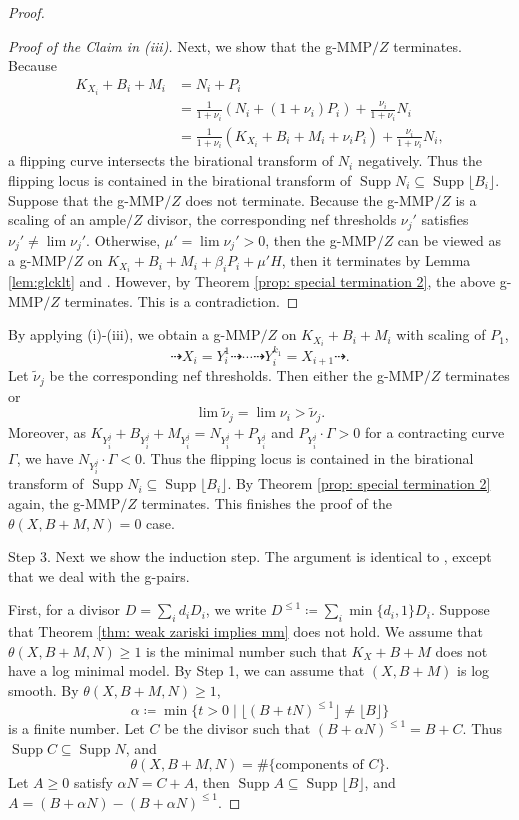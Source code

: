 \documentclass[11pt]{amsart}
\newcommand{\Supp}{\operatorname{Supp}}
\newcommand{\lf}{\lfloor}
\newcommand{\rf}{\rfloor}
\begin{document}
\begin{proof}
\begin{proof}[Proof of the Claim in (iii)]
	Next, we show that the g-MMP$/Z$ terminates. Because
	\begin{align*}
	K_{X_i}+B_i+M_i&=N_i+P_i\\
	&=\frac{1}{1+\nu_i}(N_i+(1+\nu_i)P_i)+\frac{\nu_i}{1+\nu_i}N_i\\
	&=\frac{1}{1+\nu_i}(K_{X_i}+B_i+M_i+\nu_i P_i)+\frac{\nu_i}{1+\nu_i}N_i,
	\end{align*}
	a flipping curve intersects the birational transform of $N_i$ negatively. Thus the flipping locus is contained in the birational transform of $\Supp N_i \subseteq \Supp \lfloor B_i\rfloor$. Suppose that the g-MMP$/Z$ does not terminate. Because the g-MMP$/Z$ is a scaling of an ample$/Z$ divisor, the corresponding nef thresholds $\nu_j'$ satisfies $\nu_j' \neq \lim \nu_j'$. Otherwise, $\mu'= \lim \nu_j'>0$, then the g-MMP$/Z$ can be viewed as a g-MMP$/Z$ on $K_{X_i}+B_i+M_i+\beta_iP_i+\mu' H$, then it terminates by Lemma \ref{lem:glcklt} and \cite[Corollary 1.4.2]{BCHM10}. However, by Theorem \ref{prop: special termination 2}, the above g-MMP$/Z$ terminates. This is a contradiction.	
\end{proof}
	
By applying (i)-(iii), we obtain a g-MMP$/Z$ on $K_{X_i}+B_i+M_i$ with scaling of $P_1$, 
\[
\dashrightarrow X_i = Y_i^{1} \dashrightarrow \cdots \dashrightarrow Y_i^{k_1} = X_{i+1} \dashrightarrow.
\] Let $\tilde\nu_j$ be the corresponding nef thresholds. Then either the g-MMP$/Z$ terminates or 
\[
\lim\tilde \nu_j = \lim\nu_i>\tilde \nu_j.
\] Moreover, as $K_{Y^j_i}+B_{Y^j_i}+M_{Y^j_i}=N_{Y^j_i}+P_{Y^j_i}$ and $P_{Y^j_i} \cdot \Gamma>0$ for a contracting curve $\Gamma$, we have $N_{Y^j_i} \cdot \Gamma<0$. Thus the flipping locus is contained in the birational transform of $\Supp N_i \subseteq \Supp \lfloor B_i\rfloor$. By Theorem \ref{prop: special termination 2} again, the g-MMP$/Z$ terminates. This finishes the proof of the $\theta(X,B+M,N)=0$ case.

Step 3. Next we show the induction step. The argument is identical to \cite[Proof of Theorem 1.5]{Birkarweak12}, except that we deal with the g-pairs. 

First, for a divisor $D=\sum_i d_i D_i$, we write $D^{\leq 1} \coloneqq \sum_i \min\{d_i, 1\}D_i$. Suppose that Theorem \ref{thm: weak zariski implies mm} does not hold. We assume that $\theta(X,B+M,N) \geq 1$ is the minimal number such that $K_X+B+M$ does not have a log minimal model. By Step 1, we can assume that $(X,B+M)$ is log smooth. By $\theta(X,B+M,N) \geq 1$,
	\[
	\alpha \coloneqq \min\{t>0 \mid \lf (B+tN)^{\leq 1} \rf \neq \lf B \rf\} 
	\] is a finite number. Let $C$ be the divisor such that $(B+\alpha N)^{\leq 1} = B+C$. Thus $\Supp C \subseteq \Supp N$, and 
	\begin{equation}\label{eq: components of C}
	\theta(X,B+M,N) = \#\{\text{components of~}C\}.
	\end{equation} Let $A \geq 0$ satisfy $\alpha N = C+A$, then $\Supp A \subseteq \Supp \lf B \rf$, and $A=(B+\alpha N)-(B+\alpha N)^{\leq 1}$.
	

\end{proof}
\end{document}
